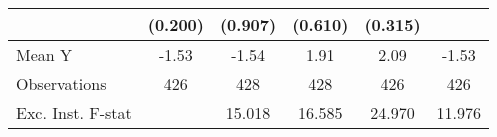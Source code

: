 {\begin{tabular}{l*{5}{c}}
            &     (0.200)         &     (0.907)         &     (0.610)         &     (0.315)         &                     \\
\midrule
Mean Y      &       -1.53         &       -1.54         &        1.91         &        2.09         &       -1.53         \\
Observations&         426         &         428         &         428         &         426         &         426         \\
Exc. Inst. F-stat&                     &      15.018         &      16.585         &      24.970         &      11.976         \\
\bottomrule
\end{tabular}
}
